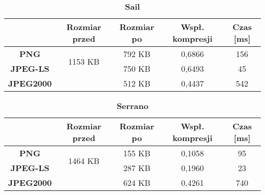 \begin{table}[!h]
	\centering
	\caption{\textbf{Sail}}
	\label{my-label}
	\begin{tabular}{|c|c|c|c|c|}                                             
		\hline
		& \textbf{Rozmiar przed} & \textbf{Rozmiar po} & \textbf{Wspł. kompresji} & \textbf{Czas {[}ms{]}} \\ \hline 
		\textbf{PNG}      &          \multicolumn{1}{c|}{\multirow{2}{*}{1153 KB}}             &       792 KB              &         0,6866                 &           156                  \\\cline{3-5}
		\textbf{JPEG-LS}  &                        &        750  KB           &         0,6493                 &          45                \\\cline{3-5}
		\textbf{JPEG2000} &                        &        512 KB             &      0,4437                    &      542                \\ \hline
	\end{tabular}
\end{table}

\begin{table}[!h]
	\centering
	\caption{\textbf{Serrano}}
	\label{my-label}
	\begin{tabular}{|c|c|c|c|c|}                                             
		\hline
		& \textbf{Rozmiar przed} & \textbf{Rozmiar po} & \textbf{Wspł. kompresji} & \textbf{Czas {[}ms{]}} \\ \hline 
		\textbf{PNG}      &          \multicolumn{1}{c|}{\multirow{2}{*}{1464 KB}}             &       155 KB              &            0,1058              &           95                  \\\cline{3-5}
		\textbf{JPEG-LS}  &                        &         287 KB            &      0,1960                    &          23                \\\cline{3-5}
		\textbf{JPEG2000} &                        &         624 KB            &         0,4261                 &       740               \\ \hline
	\end{tabular}
\end{table}

